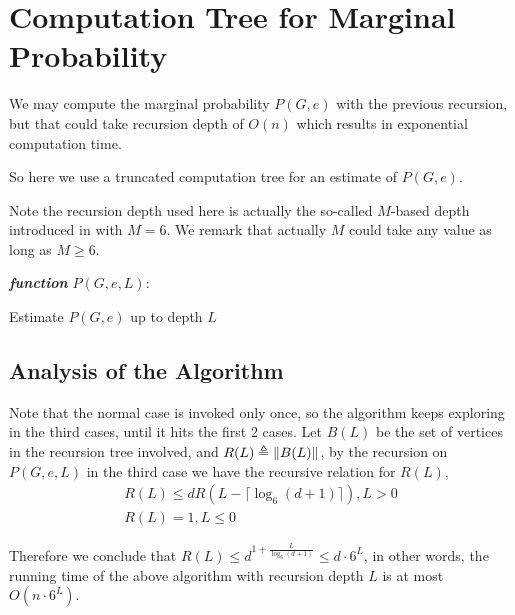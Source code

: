 
\section{Computation Tree for Marginal Probability}

We may compute the marginal probability $P(G, e)$ with the previous recursion, but
that could take recursion depth of $O(n)$ which results in exponential computation time.

So here we use a truncated computation tree for an estimate of $P(G,e)$.

Note the recursion depth used here is actually the so-called $M$-based depth introduced in \cite{LLY12} with $M=6$. We remark that actually $M$ could take any value as long as $M \geq 6$.

\IncMargin{1em}
\begin{algorithm}[H]
\emph{ \textbf{function} $P(G, e, L):$}
\BlankLine
{}
 \caption{Estimate $P(G,e)$ up to depth $L$}
\end{algorithm}
\DecMargin{1em}

\subsection{Analysis of the Algorithm}
Note that the normal case is invoked only once, so the algorithm keeps exploring in the third cases, until it hits the first 2 cases. Let $B(L)$ be the set of vertices in the recursion tree involved, and $R(L) \triangleq \left\Vert B(L)\right\Vert$,
 by the recursion on $P(G,e,L)$ in the third case we have the recursive relation for $R(L)$,
 \begin{align*}
	 R(L) \leq d R(L-\lceil \log_6{(d+1)} \rceil) , L > 0\\
	 R(L) = 1, L\leq 0
 \end{align*}

 Therefore we conclude that $R(L) \leq d^{1+\frac{L}{\log_6{(d+1)}}} \leq d\cdot 6^L$, in other words, the running time of the above algorithm with recursion depth $L$ is at most $O(n\cdot 6^L)$.
